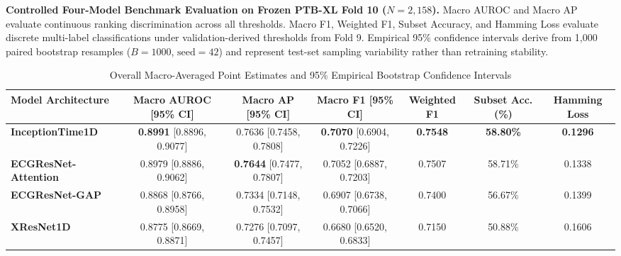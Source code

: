 \begin{table}[t]
\centering
\small
\caption{\textbf{Controlled Four-Model Benchmark Evaluation on Frozen PTB-XL Fold 10 ($N = 2,158$).} Macro AUROC and Macro AP evaluate continuous ranking discrimination across all thresholds. Macro F1, Weighted F1, Subset Accuracy, and Hamming Loss evaluate discrete multi-label classifications under validation-derived thresholds from Fold 9. Empirical 95\% confidence intervals derive from 1,000 paired bootstrap resamples ($B=1000$, $\text{seed}=42$) and represent test-set sampling variability rather than retraining stability.}
\label{tab:benchmark_performance}
\begin{subtable}{\textwidth}
\centering
\caption{Overall Macro-Averaged Point Estimates and 95\% Empirical Bootstrap Confidence Intervals}
\begin{tabular}{lcccccc}
\toprule
\textbf{Model Architecture} & \textbf{Macro AUROC [95\% CI]} & \textbf{Macro AP [95\% CI]} & \textbf{Macro F1 [95\% CI]} & \textbf{Weighted F1} & \textbf{Subset Acc. (\%)} & \textbf{Hamming Loss} \\
\midrule
\textbf{InceptionTime1D} & \textbf{0.8991} [0.8896, 0.9077] & 0.7636 [0.7458, 0.7808] & \textbf{0.7070} [0.6904, 0.7226] & \textbf{0.7548} & \textbf{58.80\%} & \textbf{0.1296} \\
\textbf{ECGResNet-Attention} & 0.8979 [0.8886, 0.9062] & \textbf{0.7644} [0.7477, 0.7807] & 0.7052 [0.6887, 0.7203] & 0.7507 & 58.71\% & 0.1338 \\
\textbf{ECGResNet-GAP} & 0.8868 [0.8766, 0.8958] & 0.7334 [0.7148, 0.7532] & 0.6907 [0.6738, 0.7066] & 0.7400 & 56.67\% & 0.1399 \\
\textbf{XResNet1D} & 0.8775 [0.8669, 0.8871] & 0.7276 [0.7097, 0.7457] & 0.6680 [0.6520, 0.6833] & 0.7150 & 50.88\% & 0.1606 \\
\bottomrule
\end{tabular}
\end{subtable}

\vspace{0.3cm}


\end{table}

